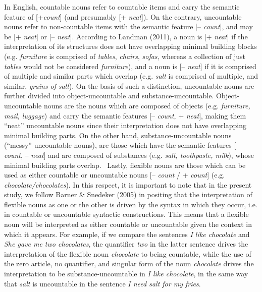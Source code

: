\documentclass[12pt]{article}
\newenvironment{styleStandard}{\setlength\leftskip{0cm}\setlength\rightskip{0cm plus 1fil}\setlength\parindent{0cm}\setlength\parfillskip{0pt plus 1fil}\setlength\parskip{0in plus 1pt}\writerlistparindent\writerlistleftskip\leavevmode\normalfont\normalsize\writerlistlabel\ignorespaces}{\unskip\vspace{0.111in plus 0.0111in}\par}
\newcommand\writerlistleftskip{}
\newcommand\writerlistparindent{}
\newcommand\writerlistlabel{}
\begin{document}
\begin{styleStandard}
In English, countable nouns refer to countable items and carry the semantic feature of [+\textit{count}] (and presumably [+ \textit{neat}]). On the contrary, uncountable nouns refer to non-countable items with the semantic feature [– \textit{count}], and may be [+ \textit{neat}] or [– \textit{neat}]. According to Landman (2011), a noun is [+ \textit{neat}] if the interpretation of its structures does not have overlapping minimal building blocks (e.g. \textit{furniture} is comprised of \textit{tables}, \textit{chairs}, \textit{sofas}, whereas a collection of just \textit{tables} would not be considered \textit{furniture}), and a noun is [– \textit{neat}] if it is comprised of multiple and similar parts which overlap (e.g. \textit{salt} is comprised of multiple, and similar,\textit{ grains of} \textit{salt}). On the basis of such a distinction, uncountable nouns are further divided into object-uncountable and substance-uncountable. Object-uncountable nouns are the nouns which are composed of objects (e.g. \textit{furniture, mail, luggage}) and carry the semantic features [– \textit{count}, + \textit{neat}], making them “neat” uncountable nouns since their interpretation does not have overlapping minimal building parts. On the other hand, substance-uncountable nouns (“messy” uncountable nouns), are those which have the semantic features [– \textit{count}, – \textit{neat}] and are composed of substances (e.g. \textit{salt, toothpaste, milk}), whose minimal building parts overlap. \ Lastly, flexible nouns are those which can be used as either countable or uncountable nouns [– \textit{count }/ + \textit{count}] (e.g. \textit{chocolate/chocolates}). In this respect, it is important to note that in the present study, we follow Barner \& Snedeker (2005) in positing that the interpretation of flexible nouns as one or the other is driven by the syntax in which they occur, i.e. in countable or uncountable syntactic constructions. This means that a flexible noun will be interpreted as either countable or uncountable given the context in which it appears. For example, if we compare the sentences \textit{I like chocolate }and \textit{She gave me two chocolates}, the quantifier \textit{two} in the latter sentence drives the interpretation of the flexible noun\textit{ chocolate} to being countable, while the use of the zero article, no quantifier, and singular form of the noun \textit{chocolate} drives the interpretation to be substance-uncountable in \textit{I like chocolate}, in the same way that \textit{salt }is uncountable in the sentence \textit{I need salt for my fries}.
\end{styleStandard}
\end{document}
